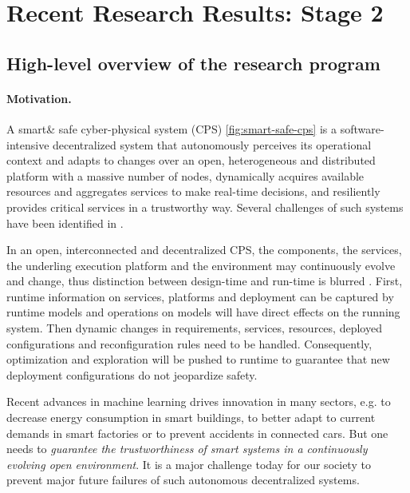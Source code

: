 \section{Recent Research Results: Stage 2 }

\subsection{High-level overview of the research program}

\paragraph{Motivation.}
 A smart\& safe cyber-physical system (CPS) \autoref{fig:smart-safe-cps} is a software-intensive decentralized system that autonomously perceives its operational context and adapts to changes over an open, heterogeneous and distributed platform with a massive number of nodes, dynamically acquires available resources and aggregates services to make real-time decisions, and resiliently provides critical services in a trustworthy way. Several challenges of such systems have been identified in \cite{Sztipanovits2012,Lee2014,Krupitzer2015,Cengarle2013,CPSoS2015}. 

In an open, interconnected and decentralized CPS, the components, the services, the underling execution platform and the environment may continuously evolve and change, thus distinction between design-time and run-time is blurred \cite{Baresi2010}. First, runtime information on services, platforms and deployment can be captured by runtime models \cite{Blair2009,Szvetits2013} and operations on models will have direct effects on the running system. Then dynamic changes in requirements, services, resources, deployed configurations and reconfiguration rules need to be handled. Consequently, optimization and exploration will be pushed to runtime to guarantee that new deployment configurations do not jeopardize safety.

Recent advances in machine learning drives innovation in many sectors, e.g. to decrease energy consumption in smart buildings, to better adapt to current demands in smart factories or to prevent accidents in connected cars. But one needs to \emph{guarantee the trustworthiness of smart systems in a continuously evolving open environment}. It is a major challenge today for our society to prevent major future failures of such autonomous decentralized systems.

